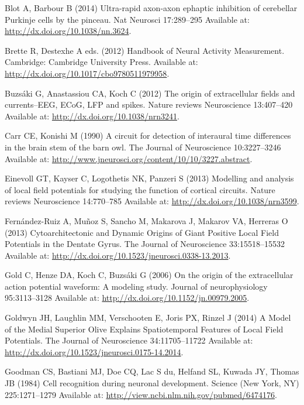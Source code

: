 \documentclass[]{article}
\begin{document}
\hypertarget{ref-Blot2014Ultrarapid}{}
Blot A, Barbour B (2014) Ultra-rapid axon-axon ephaptic inhibition of
cerebellar Purkinje cells by the pinceau. Nat Neurosci 17:289--295
Available at: \url{http://dx.doi.org/10.1038/nn.3624}.

\hypertarget{ref-Brette2012Handbook}{}
Brette R, Destexhe A eds. (2012) Handbook of Neural Activity
Measurement. Cambridge: Cambridge University Press. Available at:
\url{http://dx.doi.org/10.1017/cbo9780511979958}.

\hypertarget{ref-Buzsaki2012Origin}{}
Buzsáki G, Anastassiou CA, Koch C (2012) The origin of extracellular
fields and currents--EEG, ECoG, LFP and spikes. Nature reviews
Neuroscience 13:407--420 Available at:
\url{http://dx.doi.org/10.1038/nrn3241}.

\hypertarget{ref-carr90}{}
Carr CE, Konishi M (1990) A circuit for detection of interaural time
differences in the brain stem of the barn owl. The Journal of
Neuroscience 10:3227--3246 Available at:
\url{http://www.jneurosci.org/content/10/10/3227.abstract}.

\hypertarget{ref-Einevoll2013Modelling}{}
Einevoll GT, Kayser C, Logothetis NK, Panzeri S (2013) Modelling and
analysis of local field potentials for studying the function of cortical
circuits. Nature reviews Neuroscience 14:770--785 Available at:
\url{http://dx.doi.org/10.1038/nrn3599}.

\hypertarget{ref-FernandezRuiz2013Cytoarchitectonic}{}
Fernández-Ruiz A, Muñoz S, Sancho M, Makarova J, Makarov VA, Herreras O
(2013) Cytoarchitectonic and Dynamic Origins of Giant Positive Local
Field Potentials in the Dentate Gyrus. The Journal of Neuroscience
33:15518--15532 Available at:
\url{http://dx.doi.org/10.1523/jneurosci.0338-13.2013}.

\hypertarget{ref-Gold2006Origin}{}
Gold C, Henze DA, Koch C, Buzsáki G (2006) On the origin of the
extracellular action potential waveform: A modeling study. Journal of
neurophysiology 95:3113--3128 Available at:
\url{http://dx.doi.org/10.1152/jn.00979.2005}.

\hypertarget{ref-Goldwyn2014Model}{}
Goldwyn JH, Laughlin MM, Verschooten E, Joris PX, Rinzel J (2014) A
Model of the Medial Superior Olive Explains Spatiotemporal Features of
Local Field Potentials. The Journal of Neuroscience 34:11705--11722
Available at: \url{http://dx.doi.org/10.1523/jneurosci.0175-14.2014}.

\hypertarget{ref-Goodman1984Cell}{}
Goodman CS, Bastiani MJ, Doe CQ, Lac S du, Helfand SL, Kuwada JY, Thomas
JB (1984) Cell recognition during neuronal development. Science (New
York, NY) 225:1271--1279 Available at:
\url{http://view.ncbi.nlm.nih.gov/pubmed/6474176}.
\end{document}
